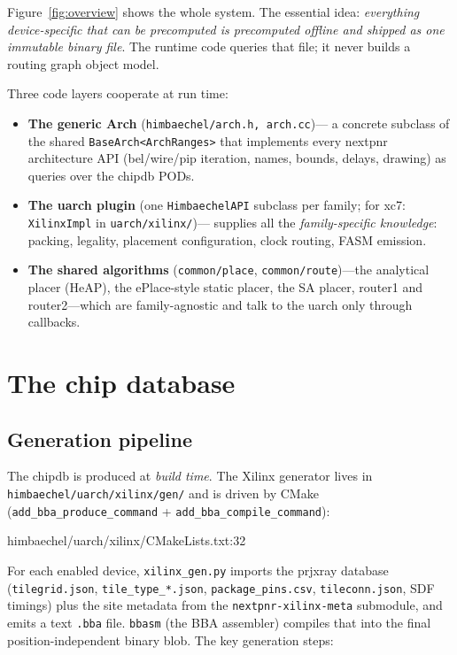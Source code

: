 \documentclass[11pt,a4paper]{article}
\begin{document}
Figure~\ref{fig:overview} shows the whole system. The essential idea:
\emph{everything device-specific that can be precomputed is precomputed
offline and shipped as one immutable binary file}. The runtime code
queries that file; it never builds a routing graph object model.

Three code layers cooperate at run time:

\begin{itemize}
\item \textbf{The generic Arch} (\texttt{himbaechel/arch.h, arch.cc})---
  a concrete subclass of the shared \texttt{BaseArch<ArchRanges>} that
  implements every nextpnr architecture API (bel/wire/pip iteration,
  names, bounds, delays, drawing) as queries over the chipdb PODs.
\item \textbf{The uarch plugin} (one \texttt{HimbaechelAPI} subclass per
  family; for xc7: \texttt{XilinxImpl} in \texttt{uarch/xilinx/})---
  supplies all the \emph{family-specific knowledge}: packing,
  legality, placement configuration, clock routing, FASM emission.
\item \textbf{The shared algorithms} (\texttt{common/place},
  \texttt{common/route})---the analytical placer (HeAP), the ePlace-style
  static placer, the SA placer, router1 and router2---which are
  family-agnostic and talk to the uarch only through callbacks.
\end{itemize}

\section{The chip database}

\subsection{Generation pipeline}

The chipdb is produced at \emph{build time}. The Xilinx generator lives
in \texttt{himbaechel/\allowbreak uarch/\allowbreak xilinx/\allowbreak gen/} and is driven by CMake
(\texttt{add\_bba\_produce\_command}\allowbreak{} +
\texttt{add\_bba\_compile\_command}):

\begin{cppfile}{himbaechel/uarch/xilinx/CMakeLists.txt:32}
  
\end{cppfile}

For each enabled device, \texttt{xilinx\_gen.py} imports the prjxray
database (\texttt{tilegrid.json}, \texttt{tile\_type\_*.json},
\texttt{package\_pins.csv}, \texttt{tileconn.json}, SDF timings) plus
the site metadata from the \texttt{nextpnr-xilinx-meta} submodule, and
emits a text \texttt{.bba} file. \texttt{bbasm} (the BBA assembler)
compiles that into the final position-independent binary blob. The key
generation steps:
\end{document}
